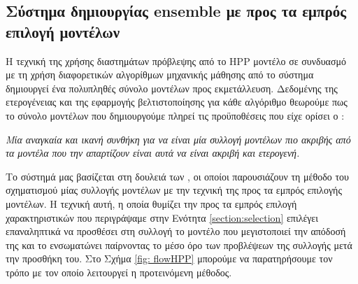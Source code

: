 \subsection{Σύστημα δημιουργίας ensemble με προς τα εμπρός επιλογή μοντέλων} Η τεχνική της χρήσης διαστημάτων πρόβλεψης από το HPP μοντέλο σε συνδυασμό με τη χρήση διαφορετικών αλγορίθμων μηχανικής μάθησης από το σύστημα δημιουργεί ένα πολυπληθές σύνολο μοντέλων προς εκμετάλλευση. Δεδομένης της ετερογένειας και της εφαρμογής βελτιστοποίησης για κάθε αλγόριθμο θεωρούμε πως το σύνολο μοντέλων που δημιουργούμε πληρεί τις προϋποθέσεις που είχε ορίσει ο \citet{Dietterich2000}:  

\begin{displayquote}
	\textit{Μία αναγκαία και ικανή συνθήκη για να είναι μία συλλογή μοντέλων πιο ακριβής από τα μοντέλα που την απαρτίζουν είναι αυτά να είναι ακριβή και ετερογενή.}
\end{displayquote}

Το σύστημά μας βασίζεται στη δουλειά των \citet{Caruana:2004:ESL:1015330.1015432}, οι οποίοι παρουσιάζουν τη μέθοδο του σχηματισμού μίας συλλογής μοντέλων με την τεχνική της προς τα εμπρός επιλογής μοντέλων. Η τεχνική αυτή, η οποία θυμίζει την προς τα εμπρός επιλογή χαρακτηριστικών που περιγράψαμε στην Ενότητα \ref{section:selection} επιλέγει επαναληπτικά να προσθέσει στη συλλογή το μοντέλο που μεγιστοποιεί την απόδοσή της και το ενσωματώνει παίρνοντας το μέσο όρο των προβλέψεων της συλλογής μετά την προσθήκη του. Στο Σχήμα \ref{fig: flowHPP} μπορούμε να παρατηρήσουμε τον τρόπο με τον οποίο λειτουργεί η προτεινόμενη μέθοδος.

